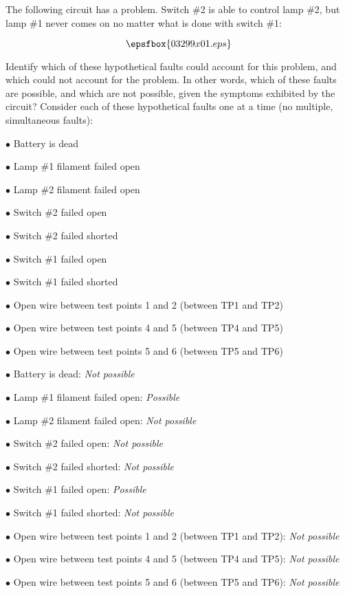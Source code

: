 

The following circuit has a problem.  Switch \#2 is able to control lamp \#2, but lamp \#1 never comes on no matter what is done with switch \#1:

$$\epsfbox{03299x01.eps}$$

\goodbreak
Identify which of these hypothetical faults could account for this problem, and which could not account for the problem.  In other words, which of these faults are possible, and which are not possible, given the symptoms exhibited by the circuit?  Consider each of these hypothetical faults one at a time (no multiple, simultaneous faults):

\medskip
\item{$\bullet$} Battery is dead
\item{$\bullet$} Lamp \#1 filament failed open
\item{$\bullet$} Lamp \#2 filament failed open
\item{$\bullet$} Switch \#2 failed open
\item{$\bullet$} Switch \#2 failed shorted
\item{$\bullet$} Switch \#1 failed open
\item{$\bullet$} Switch \#1 failed shorted
\item{$\bullet$} Open wire between test points 1 and 2 (between TP1 and TP2)
\item{$\bullet$} Open wire between test points 4 and 5 (between TP4 and TP5)
\item{$\bullet$} Open wire between test points 5 and 6 (between TP5 and TP6)
\medskip







\medskip
\item{$\bullet$} Battery is dead: {\it Not possible}
\item{$\bullet$} Lamp \#1 filament failed open: {\it Possible}
\item{$\bullet$} Lamp \#2 filament failed open: {\it Not possible}
\item{$\bullet$} Switch \#2 failed open: {\it Not possible}
\item{$\bullet$} Switch \#2 failed shorted: {\it Not possible}
\item{$\bullet$} Switch \#1 failed open: {\it Possible}
\item{$\bullet$} Switch \#1 failed shorted: {\it Not possible}
\item{$\bullet$} Open wire between test points 1 and 2 (between TP1 and TP2): {\it Not possible}
\item{$\bullet$} Open wire between test points 4 and 5 (between TP4 and TP5): {\it Not possible}
\item{$\bullet$} Open wire between test points 5 and 6 (between TP5 and TP6): {\it Not possible}
\medskip

